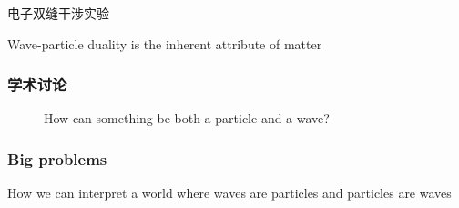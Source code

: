 \begin{frame}{电子双缝干涉实验}
\end{frame}

\begin{frame}  
    \begin{tcolorbox}[colback=yellow!10,colframe=red!75!black,title=Conclusion]
    Wave-particle duality is the inherent attribute of matter
    \end{tcolorbox} 
\end{frame}

\begin{frame}
    \frametitle{学术讨论}
        \begin{figure}
            \centering
            \caption{{\color{red} How can something be both a particle and a wave?}} %
        \end{figure}
\end{frame}

\begin{frame}  
    \frametitle{Big problems} 
  \begin{center}
    How we can interpret a world where waves are particles and particles are waves
  \end{center} 
\end{frame}

